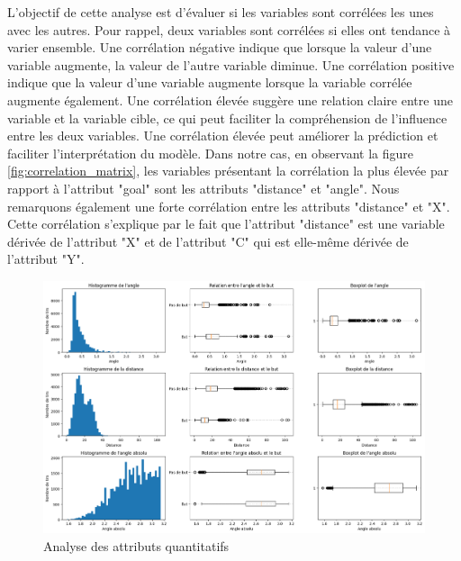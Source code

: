\documentclass[12pt]{article}
\begin{document}
L'objectif de cette analyse est d'évaluer si les variables sont corrélées les unes avec les autres.
Pour rappel, deux variables sont corrélées si elles ont tendance à varier ensemble.
Une corrélation négative indique que lorsque la valeur d'une variable augmente, la valeur de l'autre variable diminue.
Une corrélation positive indique que la valeur d'une variable augmente lorsque la variable corrélée augmente également.
Une corrélation élevée suggère une relation claire entre une variable et la variable cible, ce qui peut faciliter la compréhension de l'influence entre les deux variables.
Une corrélation élevée peut améliorer la prédiction et faciliter l'interprétation du modèle.
\newline\newline
Dans notre cas, en observant la figure \ref{fig:correlation_matrix}, les variables présentant la corrélation la plus élevée par rapport à l'attribut "goal" sont les attributs "distance" et "angle".
Nous remarquons également une forte corrélation entre les attributs "distance" et "X".
Cette corrélation s'explique par le fait que l'attribut "distance" est une variable dérivée de l'attribut "X" et de l'attribut "C" qui est elle-même dérivée de l'attribut "Y".
\begin{figure}[htp]
    \centering
    \includegraphics[width=\textwidth]{img/analyseOutlier.png}
    \caption{Analyse des attributs quantitatifs}
    \label{fig:analyse_quantitative}
\end{figure}
\end{document}
